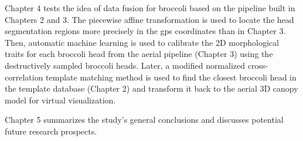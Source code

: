 

Chapter 4 tests the idea of data fusion for broccoli based on the pipeline built in Chapters 2 and 3. The piecewise affine transformation is used to locate the head segmentation regions more precisely in the \gls{gps}  coordinates than in Chapter 3. Then, automatic machine learning is used to calibrate the 2D morphological traits for each broccoli head from the aerial pipeline (Chapter 3) using the destructively sampled broccoli heads. Later, a modified normalized cross-correlation template matching method is used to find the closest broccoli head in the template database (Chapter 2) and transform it back to the aerial 3D canopy model for virtual visualization.

Chapter 5 summarizes the study's general conclusions and discusses potential future research prospects.


